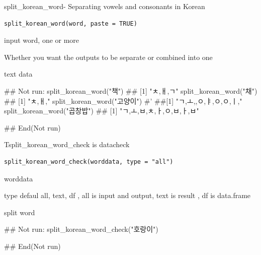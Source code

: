 \documentclass[a4paper]{book}
\begin{document}
%
\begin{Description}
split\_korean\_word- Separating vowels and consonants in Korean
\end{Description}
%
\begin{Usage}
\begin{verbatim}
split_korean_word(word, paste = TRUE)
\end{verbatim}
\end{Usage}
%
\begin{Arguments}
\begin{ldescription}
\item[\code{word}] input word, one or more

\item[\code{paste}] Whether you want the outputs to be separate or combined into one
\end{ldescription}
\end{Arguments}
%
\begin{Value}
text data
\end{Value}
%
\begin{Examples}
\begin{ExampleCode}
\#\# Not run: 
split_korean_word("책")
## [1] "ㅊ,ㅐ,ㄱ"
split_korean_word("채")
## [1] "ㅊ,ㅐ,"
split_korean_word("고양이")
#' ##[1] "ㄱ,ㅗ,,ㅇ,ㅑ,ㅇ,ㅇ,ㅣ,"
split_korean_word("곱창밥")
## [1] "ㄱ,ㅗ,ㅂ,ㅊ,ㅏ,ㅇ,ㅂ,ㅏ,ㅂ"

## End(Not run)

\end{ExampleCode}
\end{Examples}

%
\begin{Description}
Tsplit\_korean\_word\_check is datacheck
\end{Description}
%
\begin{Usage}
\begin{verbatim}
split_korean_word_check(worddata, type = "all")
\end{verbatim}
\end{Usage}
%
\begin{Arguments}
\begin{ldescription}
\item[\code{worddata}] worddata

\item[\code{type}] type defaul all, text, df , all is input and output, text is result , df is data.frame
\end{ldescription}
\end{Arguments}
%
\begin{Value}
split word
\end{Value}
%
\begin{Examples}
\begin{ExampleCode}
\#\# Not run: 
split_korean_word_check("호랑이")

## End(Not run)

\end{ExampleCode}
\end{Examples}
\end{document}
